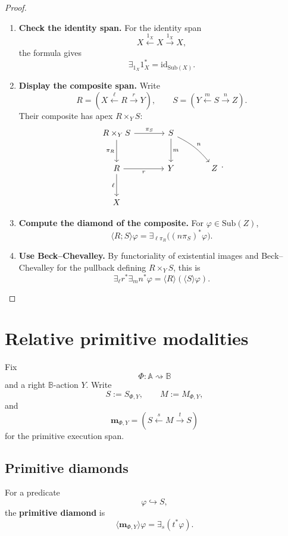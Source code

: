 \begin{proof}
\leavevmode
\begin{enumerate}
\item \textbf{Check the identity span.}
For the identity span
\[
X\xleftarrow{1_X}X\xrightarrow{1_X}X,
\]
the formula gives
\[
\exists_{1_X}1_X^\ast=\mathrm{id}_{\mathrm{Sub}(X)}.
\]

\item \textbf{Display the composite span.}
Write
\[
R=(X\xleftarrow{\ell}R\xrightarrow{r}Y),
\qquad
S=(Y\xleftarrow{m}S\xrightarrow{n}Z).
\]
Their composite has apex \(R\times_Y S\):
\[
\begin{tikzcd}[column sep=large,row sep=large]
R\times_Y S
  \arrow[r,"\pi_S"]
  \arrow[d,"\pi_R"']
&
S
  \arrow[d,"m"]
  \arrow[dr,"n",bend left=12]
&
\\
R
  \arrow[r,"r"']
  \arrow[d,"\ell"']
&
Y
&
Z
\\
X
&&
\end{tikzcd}
.
\]

\item \textbf{Compute the diamond of the composite.}
For \(\varphi\in\mathrm{Sub}(Z)\),
\[
\langle R;S\rangle\varphi
=
\exists_{\ell\pi_R}\bigl((n\pi_S)^\ast\varphi\bigr).
\]

\item \textbf{Use Beck--Chevalley.}
By functoriality of existential images and Beck--Chevalley for the pullback
defining \(R\times_Y S\), this is
\[
\exists_\ell r^\ast\exists_m n^\ast\varphi
=
\langle R\rangle(\langle S\rangle\varphi).
\]
\end{enumerate}
\end{proof}

\section{Relative primitive modalities}
\label{sec:relative-primitive-modalities}

Fix
\[
\Phi:\mathbb A\rightsquigarrow\mathbb B
\]
and a right \(\mathbb B\)-action \(Y\). Write
\[
S:=S_{\Phi,Y},
\qquad
M:=M_{\Phi,Y},
\]
and
\[
\mathbf m_{\Phi,Y}
=
(S\xleftarrow{s}M\xrightarrow{t}S)
\]
for the primitive execution span.

\subsection{Primitive diamonds}
\label{subsec:relative-primitive-diamonds}

\begin{definition}
\label{def:relative-primitive-diamond}
For a predicate
\[
\varphi\hookrightarrow S,
\]
the \textbf{primitive diamond} is
\[
\langle \mathbf m_{\Phi,Y}\rangle\varphi
=
\exists_s(t^\ast\varphi).
\]
\end{definition}

